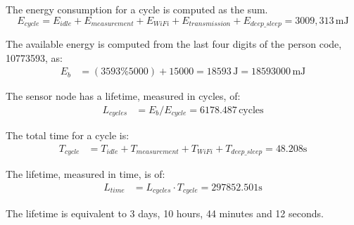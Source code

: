 The energy consumption for a cycle is computed as the sum.
\[
E_{cycle} = E_{idle} + E_{measurement} + E_{WiFi} + E_{transmission} + E_{deep\_sleep} = 3009,313\,\text{mJ} 
\]

The available energy is computed from the last four digits of the person code, 10773593, as: 
\begin{align*}
	E_{b} &= (3593 \% 5000) + 15000 = 18593\,\text{J} = 18593000\,\text{mJ}
\end{align*}

The sensor node has a lifetime, measured in cycles, of:
\begin{align*}
	L_{cycles}&= E_{b}/E_{cycle} = 6178.487 \,\text{cycles} 
\end{align*}

The total time for a cycle is:
\begin{align*}
	T_{cycle} &= T_{idle} + T_{measurement} + T_{WiFi} + T_{deep\_sleep} = 48.208 \text{s}
\end{align*}

The lifetime, measured in time, is of:
\begin{align*}
	L_{time}&= L_{cycles} \cdot T_{cycle} = 297852.501 \text{s}
\end{align*}

The lifetime is equivalent to 3 days, 10 hours, 44 minutes and 12 seconds.


